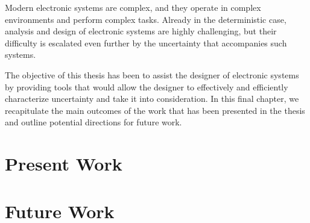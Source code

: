 Modern electronic systems are complex, and they operate in complex environments
and perform complex tasks. Already in the deterministic case, analysis and
design of electronic systems are highly challenging, but their difficulty is
escalated even further by the uncertainty that accompanies such systems.

The objective of this thesis has been to assist the designer of electronic
systems by providing tools that would allow the designer to effectively and
efficiently characterize uncertainty and take it into consideration. In this
final chapter, we recapitulate the main outcomes of the work that has been
presented in the thesis and outline potential directions for future work.

\section{Present Work}

\section{Future Work}
